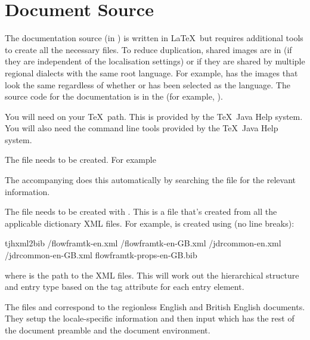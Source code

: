 \section{Document Source}\label{sec:docsource}

The documentation source (in ) is written in
\LaTeX\ but requires additional tools to create all the necessary
files. To reduce duplication, shared images are in
 (if they are independent of the
localisation settings) or
 if they are shared by
multiple regional dialects with the same root language.
For example,  has the images that look the
same regardless of whether  or  has been
selected as the language. The source code for the documentation is
in the  (for example,
).

You will need  on your \TeX\ path. This is
provided by the \TeX\ Java Help system. You will also need the
command line tools provided by the \TeX\ Java Help system.

The  file needs to be created. For example
\begin{compactcodebox}
\marg{\thedocversion}\marg{\thedocdate}
\end{compactcodebox}
The accompanying  does this automatically by
searching the  file for the relevant
information.

The  file needs to be
created with . This is a  file
that's created from all the applicable dictionary XML files.
For example,  is created using
(no line breaks):
\begin{terminal}
tjhxml2bib   /flowframtk-en.xml /flowframtk-en-GB.xml /jdrcommon-en.xml /jdrcommon-en-GB.xml  flowframtk-props-en-GB.bib
\end{terminal}
where  is the path to the XML files.
This will work out the hierarchical structure and entry type based
on the tag attribute for each entry element.

The files  and
 correspond to the regionless
English and British English documents. They setup the
locale-specific information and then input
 which has the rest of the document
preamble and the document environment.

